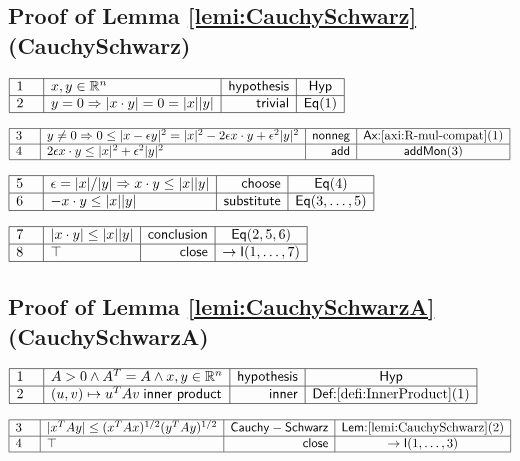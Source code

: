 \documentclass[11pt,reqno]{amsart}
\providecommand{\R}{\mathbb{R}}
\begin{document}
	\subsection*{Proof of Lemma \protect\ref{lemi:CauchySchwarz} (\textsf{CauchySchwarz})}
	\noindent$\begin{array}{|m{0.5cm}|l|r|c|}
	\hline
	1 & x,y\in\R^{n} & \mathsf{hypothesis} & \mathsf{Hyp} \\ \hline
	2 & y=0\Rightarrow|x\cdot y|=0=|x||y| & \mathsf{trivial} & \mathsf{Eq}(1) \\ \hline
	\end{array}$
	\par\nointerlineskip\noindent$\begin{array}{|m{0.5cm}|l|r|c|}
	\hline
	3 & y\neq0\Rightarrow0\le|x-\epsilon y|^{2}=|x|^{2}-2\epsilon x\cdot y+\epsilon^{2}|y|^{2} & \mathsf{nonneg} & \textsf{Ax:}\ref{axi:R-mul-compat}(1) \\ \hline
	4 & 2\epsilon x\cdot y\le|x|^{2}+\epsilon^{2}|y|^{2} & \mathsf{add} & \mathsf{addMon}(3) \\ \hline
	\end{array}$
	\par\nointerlineskip\noindent$\begin{array}{|m{0.5cm}|l|r|c|}
	\hline
	5 & \epsilon=|x|/|y|\Rightarrow x\cdot y\le|x||y| & \mathsf{choose} & \mathsf{Eq}(4) \\ \hline
	6 & -x\cdot y\le|x||y| & \mathsf{substitute} & \mathsf{Eq}(3,\dots,5) \\ \hline
	\end{array}$
	\par\nointerlineskip\noindent$\begin{array}{|m{0.5cm}|l|r|c|}
	\hline
	7 & |x\cdot y|\le|x||y| & \mathsf{conclusion} & \mathsf{Eq}(2,5,6) \\ \hline
	8 & \top & \mathsf{close} & \to\mathsf{I}(1,\dots,7) \\ \hline
	\end{array}$
	\medskip
	
	\subsection*{Proof of Lemma \protect\ref{lemi:CauchySchwarzA} (\textsf{CauchySchwarzA})}
	\noindent$\begin{array}{|m{0.5cm}|l|r|c|}
	\hline
	1 & A>0\wedge A^{T}=A\wedge x,y\in\R^{n} & \mathsf{hypothesis} & \mathsf{Hyp} \\ \hline
	2 & (u,v)\mapsto u^{T}Av\;\mathsf{inner\ product} & \mathsf{inner} & \textsf{Def:}\ref{defi:InnerProduct}(1) \\ \hline
	\end{array}$
	\par\nointerlineskip\noindent$\begin{array}{|m{0.5cm}|l|r|c|}
	\hline
	3 & |x^{T}Ay|\le(x^{T}Ax)^{1/2}(y^{T}Ay)^{1/2} & \mathsf{Cauchy-Schwarz} & \textsf{Lem:}\ref{lemi:CauchySchwarz}(2) \\ \hline
	4 & \top & \mathsf{close} & \to\mathsf{I}(1,\dots,3) \\ \hline
	\end{array}$
	\medskip
	
\end{document}
